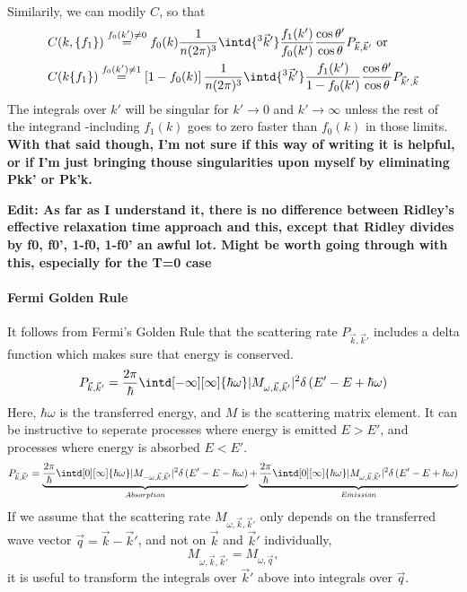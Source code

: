 \documentclass[physics,phd,nolot,nolof]{uccthesis}%
\newcommand{\alert}[1]{\textbf{\color{red}#1}}
\begin{document}
{Similarily, we can modily $C$, so that
\begin{equation}
  \begin{split}
    &C(k,\{f_{1}\}) \stackrel{f_0(k')\neq 0}{=}
f_0(k)\frac{1}{n(2\pi)^3} \intd{^3\vec k'  }
	\frac{f_1(k')}{f_0(k')} \frac{\cos\theta'}{\cos\theta}
  		  P_{\vec k,\vec k'}
\text{ or }\\
&C(k\{f_{1}\}) \stackrel{f_0(k')\neq 1}{=}
\left[1-f_0(k)\right]\frac{1}{n(2\pi)^3} \intd{^3\vec k'  }
	\frac{f_1(k')}{1-f_0(k')} \frac{\cos\theta'}{\cos\theta}
  		  P_{\vec k',\vec k}
  \end{split}
  \label{eq:Ck}
\end{equation}
The integrals over $k'$ will be singular for $k'\to0$ and $k'\to\infty$ 
unless the rest of the integrand -including $f_1(k)$ goes to zero faster than $f_0(k)$ in those limits.
\alert{With that said though, I'm not sure if this way of writing it is helpful, or if I'm just bringing thouse singularities upon myself by eliminating Pkk' or Pk'k.
}

\alert{Edit: As far as I understand it, there is no difference between Ridley's effective
relaxation time approach and this, except that Ridley divides by f0, f0', 1-f0, 1-f0' an awful lot. Might be worth going through with this, especially for the T=0 case}
\paragraph*{Fermi Golden Rule}
It follows from Fermi's Golden Rule\cite{Dirac-fermi-golden-rule1927}
that the scattering rate 
$  P_{\vec k, \vec k'}$ includes a delta function which makes sure that 
energy is conserved.
\begin{equation}
  P_{\vec k, \vec k'}= 
  \frac{2\pi}{\hbar} 
  \intd[-\infty][\infty]{\hbar\omega}|M_{\omega,\vec k,\vec k'}|^2 \delta\left(E' - E +\hbar\omega \right)
  \label{eq:FermiGoldenRule-variation}
\end{equation}
Here, $\hbar\omega$ is the transferred energy, and $M$ is the scattering matrix element.
It can be instructive to seperate processes where energy is emitted $E>E'$, 
and processes where energy is absorbed $E<E'$.
\begin{equation}
  P_{\vec k, \vec k'}= 
  \underbrace{
  \frac{2\pi}{\hbar} 
 \intd[0][\infty]{\hbar\omega }|M_{-\omega,\vec k,\vec k'}|^2 \delta\left(E' - E -\hbar\omega \right)
  }_{Absorption}
+ 
  \underbrace{
  \frac{2\pi}{\hbar} 
\intd[0][\infty]{\hbar\omega} |M_{\omega,\vec k,\vec k'}|^2 \delta\left(E' - E +\hbar\omega \right)
  }_{Emission}
  \label{eq:FermiGoldenRule-variation-em-ab}
\end{equation}
If we assume that the scattering rate $M_{\omega,\vec k, \vec k'}$ only depends on the 
transferred wave vector $\vec q = \vec k -\vec k'$, and not on $\vec k$ and $\vec k'$
individually, 
\begin{equation}
  M_{\omega,\vec k,\vec k'} = M_{\omega,\vec q},
  \label{eq:Matrix-element-q}
\end{equation}
it is useful to transform the integrals over $\vec k'$ above into
integrals over $\vec q$.

}
\end{document}
